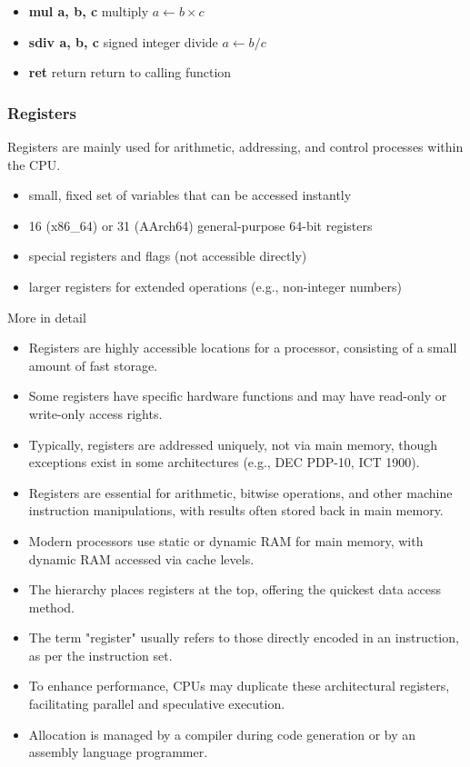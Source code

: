 \documentclass[12pt]{article}
\begin{document}
\begin{itemize}
  \item \textbf{mul a, b, c} \qquad multiply \hfill $a \gets b \times c$
  \item \textbf{sdiv a, b, c} \qquad signed integer divide \hfill $a \gets b / c$
  \item \textbf{ret} \qquad return \hfill return to calling function
\end{itemize}

\subsubsection{Registers}
Registers are mainly used for arithmetic, addressing, and control processes within the CPU.

\begin{itemize}
    \item small, fixed set of variables that can be accessed instantly
    \item 16 (x86\_64) or 31 (AArch64) general-purpose 64-bit registers
    \item special registers and flags (not accessible directly)
    \item larger registers for extended operations (e.g., non-integer numbers)
\end{itemize}
More in detail
\begin{itemize}
    \item Registers are highly accessible locations for a processor, consisting of a small amount of fast storage.
    \item Some registers have specific hardware functions and may have read-only or write-only access rights.
    \item Typically, registers are addressed uniquely, not via main memory, though exceptions exist in some architectures (e.g., DEC PDP-10, ICT 1900).
    \item Registers are essential for arithmetic, bitwise operations, and other machine instruction manipulations, with results often stored back in main memory.
    \item Modern processors use static or dynamic RAM for main memory, with dynamic RAM accessed via cache levels.
    \item The hierarchy places registers at the top, offering the quickest data access method.
    \item The term "register" usually refers to those directly encoded in an instruction, as per the instruction set.
    \item To enhance performance, CPUs may duplicate these architectural registers, facilitating parallel and speculative execution.
    \item Allocation is managed by a compiler during code generation or by an assembly language programmer.
\end{itemize}
\end{document}
